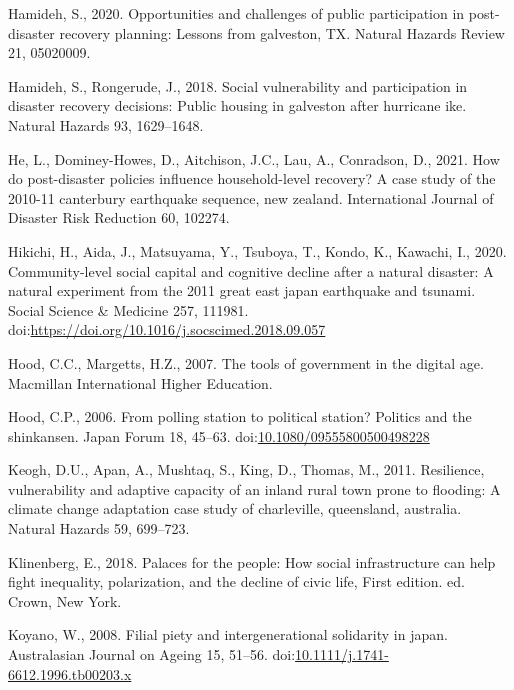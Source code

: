 \documentclass[]{elsarticle} %
\newlength{\cslhangindent}
\newlength{\cslentryspacingunit} %
\newenvironment{CSLReferences}[2] %
 {%
  \setlength{\parindent}{0pt}
  \ifodd #1
  \let\oldpar\par
  \def\par{\hangindent=\cslhangindent\oldpar}
  \fi
  \setlength{\parskip}{#2\cslentryspacingunit}
 }%
 {}
\begin{document}
\begin{CSLReferences}{1}{0}
\leavevmode{}%
Hamideh, S., 2020. Opportunities and challenges of public participation
in post-disaster recovery planning: Lessons from galveston, TX. Natural
Hazards Review 21, 05020009.

\leavevmode{}%
Hamideh, S., Rongerude, J., 2018. Social vulnerability and participation
in disaster recovery decisions: Public housing in galveston after
hurricane ike. Natural Hazards 93, 1629--1648.

\leavevmode{}%
He, L., Dominey-Howes, D., Aitchison, J.C., Lau, A., Conradson, D.,
2021. How do post-disaster policies influence household-level recovery?
A case study of the 2010-11 canterbury earthquake sequence, new zealand.
International Journal of Disaster Risk Reduction 60, 102274.

\leavevmode{}%
Hikichi, H., Aida, J., Matsuyama, Y., Tsuboya, T., Kondo, K., Kawachi,
I., 2020. Community-level social capital and cognitive decline after a
natural disaster: A natural experiment from the 2011 great east japan
earthquake and tsunami. Social Science \& Medicine 257, 111981.
doi:\url{https://doi.org/10.1016/j.socscimed.2018.09.057}

\leavevmode{}%
Hood, C.C., Margetts, H.Z., 2007. The tools of government in the digital
age. Macmillan International Higher Education.

\leavevmode{}%
Hood, C.P., 2006. From polling station to political station? Politics
and the shinkansen. Japan Forum 18, 45--63.
doi:\href{https://doi.org/10.1080/09555800500498228}{10.1080/09555800500498228}

\leavevmode{}%
Keogh, D.U., Apan, A., Mushtaq, S., King, D., Thomas, M., 2011.
Resilience, vulnerability and adaptive capacity of an inland rural town
prone to flooding: A climate change adaptation case study of
charleville, queensland, australia. Natural Hazards 59, 699--723.

\leavevmode{}%
Klinenberg, E., 2018. Palaces for the people: How social infrastructure
can help fight inequality, polarization, and the decline of civic life,
First edition. ed. Crown, New York.

\leavevmode{}%
Koyano, W., 2008. Filial piety and intergenerational solidarity in
japan. Australasian Journal on Ageing 15, 51--56.
doi:\href{https://doi.org/10.1111/j.1741-6612.1996.tb00203.x}{10.1111/j.1741-6612.1996.tb00203.x}


\end{CSLReferences}
\end{document}
